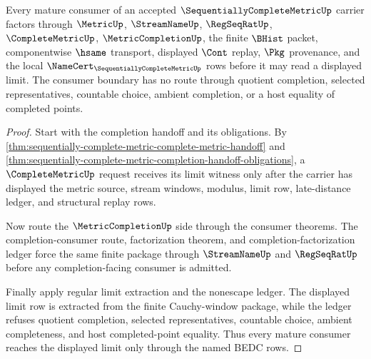 \begin{theorem}
\label{thm:sequentially-complete-metric-mature-consumer-boundary}
Every mature consumer of an accepted $\SequentiallyCompleteMetricUp$ carrier factors through $\MetricUp$, $\StreamNameUp$, $\RegSeqRatUp$, $\CompleteMetricUp$, $\MetricCompletionUp$, the finite $\BHist$ packet, componentwise $\hsame$ transport, displayed $\Cont$ replay, $\Pkg$ provenance, and the local $\NameCert_{\SequentiallyCompleteMetricUp}$ rows before it may read a displayed limit. The consumer boundary has no route through quotient completion, selected representatives, countable choice, ambient completion, or a host equality of completed points.
\end{theorem}
\begin{proof}
Start with the completion handoff and its obligations. By \autoref{thm:sequentially-complete-metric-complete-metric-handoff} and \autoref{thm:sequentially-complete-metric-completion-handoff-obligations}, a $\CompleteMetricUp$ request receives its limit witness only after the carrier has displayed the metric source, stream windows, modulus, limit row, late-distance ledger, and structural replay rows.

Now route the $\MetricCompletionUp$ side through the consumer theorems. The completion-consumer route, factorization theorem, and completion-factorization ledger force the same finite package through $\StreamNameUp$ and $\RegSeqRatUp$ before any completion-facing consumer is admitted.

Finally apply regular limit extraction and the nonescape ledger. The displayed limit row is extracted from the finite Cauchy-window package, while the ledger refuses quotient completion, selected representatives, countable choice, ambient completeness, and host completed-point equality. Thus every mature consumer reaches the displayed limit only through the named BEDC rows.
\end{proof}

